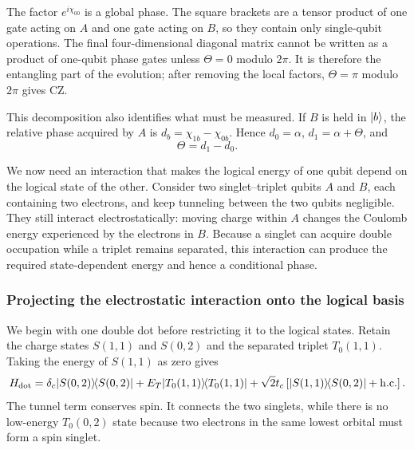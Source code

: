 The factor $e^{i\chi_{00}}$ is a global phase. The square brackets
are a tensor product of one gate acting on $A$ and one gate acting
on $B$, so they contain only single-qubit operations. The final
four-dimensional diagonal matrix cannot be
written as a product of one-qubit phase gates unless
$\Theta=0$ modulo $2\pi$. It is therefore the entangling part of
the evolution; after removing the local factors, $\Theta=\pi$
modulo $2\pi$ gives CZ.

This decomposition also identifies what must be measured. If $B$
is held in $\lvert b\rangle$, the relative phase acquired by $A$ is
$d_b=\chi_{1b}-\chi_{0b}$. Hence $d_0=\alpha$,
$d_1=\alpha+\Theta$, and
\[
 \Theta=d_1-d_0.
\]

We now need an interaction that makes the logical energy of one
qubit depend on the logical state of the other. Consider two
singlet--triplet qubits $A$ and $B$, each containing two electrons,
and keep tunneling between the two qubits negligible. They still
interact electrostatically: moving charge within $A$ changes the
Coulomb energy experienced by the electrons in $B$. Because a
singlet can acquire double occupation while a triplet remains
separated, this interaction can produce the required state-dependent
energy and hence a conditional phase.

\subsubsection{Projecting the electrostatic interaction onto the logical basis}
\label{sec:calibration-capacitive-st-interaction}

We begin with one double dot before restricting it to the logical
states. Retain the charge states $S(1,1)$ and $S(0,2)$ and the
separated triplet $T_0(1,1)$. Taking the energy of $S(1,1)$ as zero
gives
\begin{equation}
 H_{\mathrm{dot}}=
 \delta_c\ket{S(0,2)}\!\bra{S(0,2)}
 +E_T\ket{T_0(1,1)}\!\bra{T_0(1,1)}
 +\sqrt2t_c
 \left[\ket{S(1,1)}\!\bra{S(0,2)}+\mathrm{h.c.}\right].
 \label{eq:calibration-st-charge-hamiltonian}
\end{equation}
The tunnel term conserves spin. It connects the two singlets, while
there is no low-energy $T_0(0,2)$ state because two electrons in the
same lowest orbital must form a spin singlet.

